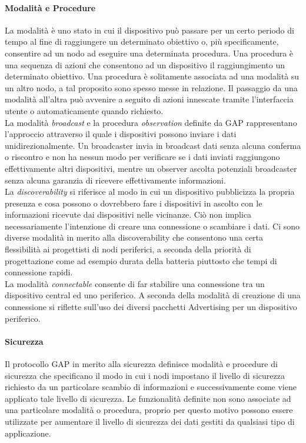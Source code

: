 \paragraph{Modalità e Procedure}
La modalità è uno stato in cui il dispositivo può passare per un certo periodo di tempo al fine di raggiungere un determinato obiettivo o, più specificamente, consentire ad un nodo ad eseguire una determinata procedura. 
Una procedura è una sequenza di azioni che consentono ad un dispositivo il raggiungimento un determinato obiettivo. Una procedura è solitamente associata ad una modalità su un altro nodo, a tal proposito sono spesso messe in relazione.
Il passaggio da una modalità all'altra può avvenire a seguito di azioni innescate tramite l'interfaccia utente o automaticamente quando richiesto.\\

\noindent La modalità \textit{broadcast} e la procedura \textit{observation} definite da GAP rappresentano l'approccio attraverso il quale i dispositivi possono inviare i dati unidirezionalmente. Un broadcaster invia in broadcast dati senza alcuna conferma o riscontro e non ha nessun modo per verificare se i dati inviati raggiungono effettivamente altri dispositivi, mentre un observer ascolta potenziali broadcaster senza alcuna garanzia di ricevere effettivamente informazioni.\\

\noindent La \textit{discoverability} si riferisce al modo in cui un dispositivo pubblicizza la propria presenza e cosa possono o dovrebbero fare i dispositivi in ascolto con le informazioni ricevute dai dispositivi nelle vicinanze. Ciò non implica necessariamente
l'intenzione di creare una connessione o scambiare i dati. Ci sono diverse modalità in merito alla discoverability che consentono una certa flessibilità ai progettisti di nodi periferici, a seconda della priorità di progettazione come ad esempio durata della batteria piuttosto che tempi di connessione rapidi.\\

\noindent La modalità \textit{connectable} consente di far stabilire una connessione tra un dispositivo central ed uno periferico. A seconda della modalità di creazione di una connessione si riflette sull'uso dei diversi pacchetti Advertising per un dispositivo periferico.

\paragraph{Sicurezza}
Il protocollo GAP in merito alla sicurezza definisce modalità e procedure di sicurezza che specificano il modo in cui i nodi impostano il livello di sicurezza richiesto da un particolare scambio di informazioni e successivamente come viene applicato tale livello di sicurezza. Le funzionalità definite non sono associate ad una particolare modalità o procedura, proprio per questo motivo possono essere utilizzate per aumentare il livello di sicurezza dei dati gestiti da qualsiasi tipo di applicazione.\\

